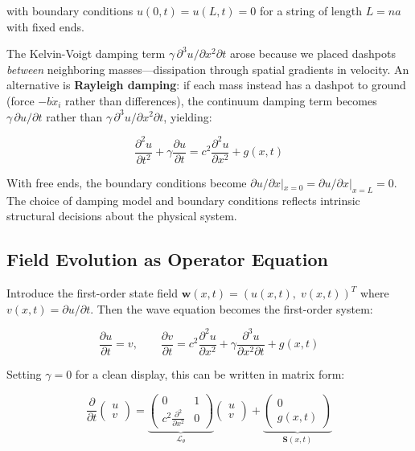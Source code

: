 \documentclass[
  letterpaper,
  DIV=11,
  numbers=noendperiod]{scrartcl}
\begin{document}
with boundary conditions \(u(0,t) = u(L,t) = 0\) for a string of length
\(L = na\) with fixed ends.

The Kelvin-Voigt damping term
\(\gamma \, \partial^3 u / \partial x^2 \partial t\) arose because we
placed dashpots \emph{between} neighboring masses---dissipation through
spatial gradients in velocity. An alternative is \textbf{Rayleigh
damping}: if each mass instead has a dashpot to ground (force
\(-b\dot{x}_i\) rather than differences), the continuum damping term
becomes \(\gamma \, \partial u / \partial t\) rather than
\(\gamma \, \partial^3 u / \partial x^2 \partial t\), yielding:

\[\frac{\partial^2 u}{\partial t^2} + \gamma \frac{\partial u}{\partial t} = c^2 \frac{\partial^2 u}{\partial x^2} + g(x,t)\]

With free ends, the boundary conditions become
\(\partial u / \partial x |_{x=0} = \partial u / \partial x |_{x=L} = 0\).
The choice of damping model and boundary conditions reflects intrinsic
structural decisions about the physical system.

\subsection{Field Evolution as Operator
Equation}\label{field-evolution-as-operator-equation}

Introduce the first-order state field
\(\mathbf{w}(x,t) = (u(x,t),\; v(x,t))^T\) where
\(v(x,t) = \partial u / \partial t\). Then the wave equation becomes the
first-order system:

\[\frac{\partial u}{\partial t} = v, \qquad \frac{\partial v}{\partial t} = c^2 \frac{\partial^2 u}{\partial x^2} + \gamma \frac{\partial^3 u}{\partial x^2 \partial t} + g(x,t)\]

Setting \(\gamma = 0\) for a clean display, this can be written in
matrix form:

\[\frac{\partial}{\partial t} \begin{pmatrix} u \\ v \end{pmatrix} = \underbrace{\begin{pmatrix} 0 & 1 \\ c^2 \frac{\partial^2}{\partial x^2} & 0 \end{pmatrix}}_{\mathcal{L}_\theta} \begin{pmatrix} u \\ v \end{pmatrix} + \underbrace{\begin{pmatrix} 0 \\ g(x,t) \end{pmatrix}}_{\mathbf{S}(x,t)}\]
\end{document}
